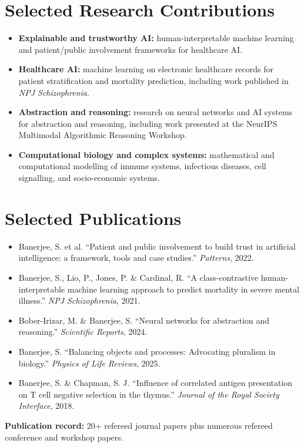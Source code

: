 \documentclass[9pt,a4paper]{article}
\begin{document}
\section*{Selected Research Contributions}
\begin{itemize}
\item \textbf{Explainable and trustworthy AI:} human-interpretable machine learning and patient/public involvement frameworks for healthcare AI.
\item \textbf{Healthcare AI:} machine learning on electronic healthcare records for patient stratification and mortality prediction, including work published in \textit{NPJ Schizophrenia}.
\item \textbf{Abstraction and reasoning:} research on neural networks and AI systems for abstraction and reasoning, including work presented at the NeurIPS Multimodal Algorithmic Reasoning Workshop.
\item \textbf{Computational biology and complex systems:} mathematical and computational modelling of immune systems, infectious diseases, cell signalling, and socio-economic systems.
\end{itemize}

\section*{Selected Publications}
\begin{itemize}
\item Banerjee, S. et al. ``Patient and public involvement to build trust in artificial intelligence: a framework, tools and case studies.'' \textit{Patterns}, 2022.
\item Banerjee, S., Lio, P., Jones, P. \& Cardinal, R. ``A class-contrastive human-interpretable machine learning approach to predict mortality in severe mental illness.'' \textit{NPJ Schizophrenia}, 2021.
\item Bober-Irizar, M. \& Banerjee, S. ``Neural networks for abstraction and reasoning.'' \textit{Scientific Reports}, 2024.
\item Banerjee, S. ``Balancing objects and processes: Advocating pluralism in biology.'' \textit{Physics of Life Reviews}, 2025.
\item Banerjee, S. \& Chapman, S. J. ``Influence of correlated antigen presentation on T cell negative selection in the thymus.'' \textit{Journal of the Royal Society Interface}, 2018.
\end{itemize}
\textbf{Publication record:} 20+ refereed journal papers plus numerous refereed conference and workshop papers.
\end{document}
